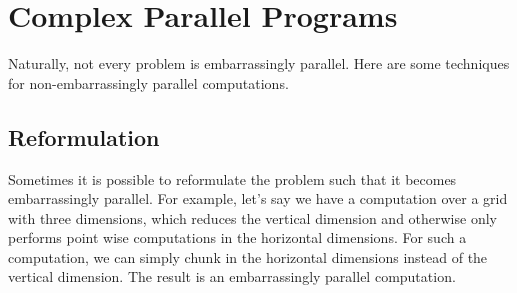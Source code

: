 \section{Complex Parallel Programs}

Naturally, not every problem is embarrassingly parallel.
Here are some techniques for non-embarrassingly parallel computations.

\subsection{Reformulation}

Sometimes it is possible to reformulate the problem such that it becomes embarrassingly parallel.
For example, let's say we have a computation over a grid with three dimensions, which reduces the vertical dimension and otherwise only performs point wise computations in the horizontal dimensions.
For such a computation, we can simply chunk in the horizontal dimensions instead of the vertical dimension.
The result is an embarrassingly parallel computation.